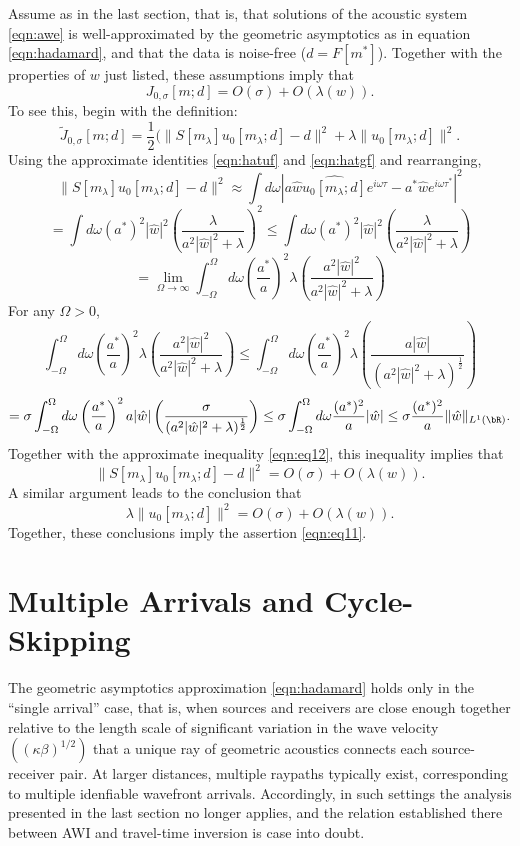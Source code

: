 Assume as in the last section, that is, that solutions
of the acoustic system \ref{eqn:awe} is well-approximated by the
geometric asymptotics as in equation \ref{eqn:hadamard}, and that the
data is noise-free ($d=F[m^*]$). Together with the properties of $w$
just listed, these assumptions imply that
\begin{equation}
  \label{eqn:eq11}
  J_{0,\sigma}[m;d] = O(\sigma) + O(\lambda(w)).
\end{equation}
To see this, begin with the definition:
\[
  \tilde{J}_{0,\sigma}[m;d] = \frac{1}{2}
  (\|S[m_{\lambda}]u_0[m_{\lambda};d]-d\|^2 + \lambda \|u_0[m_{\lambda};d]\|^2.
\]
Using the approximate identities \ref{eqn:hatuf} and \ref{eqn:hatgf} and
rearranging,
\[
\|S[m_{\lambda}]u_0[m_{\lambda};d]-d\|^2 
  \approx \int d\omega
  |a\hat{w}\hat{u_0[m_{\lambda};d]}e^{i\omega\tau}-a^*\hat{w}e^{i\omega\tau^*}|^2
\]
\[
  = \int d\omega
  (a^*)^2|\hat{w}|^2\left(\frac{\lambda}{a^2|\hat{w}|^2 +
      \lambda}\right)^2   
\le \int d\omega (a^*)^2|\hat{w}|^2
  \left(\frac{\lambda}{a^2|\hat{w}|^2 + \lambda}\right)
\]
\begin{equation}
  \label{eqn:eq12}
  = \lim_{\Omega \rightarrow \infty} \int_{-\Omega}^{\Omega} d\omega \left(\frac{a^*}{a}\right)^2\lambda
  \left(\frac{a^2|\hat{w}|^2}{a^2|\hat{w}|^2 + \lambda}\right)
\end{equation}
For any $\Omega > 0$,
\[
\int_{-\Omega}^{\Omega} d\omega \left(\frac{a^*}{a}\right)^2\lambda\left(\frac{a^2|\hat{w}|^2}{a^2|\hat{w}|^2 + \lambda}\right)
\le \int_{-\Omega}^{\Omega} d\omega \left(\frac{a^*}{a}\right)^2 \lambda
  \left(\frac{ a|\hat{w}|}{(a^2|\hat{w}|^2 +
      \lambda)^{\frac{1}{2}}}\right)
\]
\[
  = \sigma \int_{-\Omega}^{\Omega} d\omega \left(\frac{a^*}{a}\right)^2 a|\hat{w}|
  \left(\frac{\sigma }{(a^2|\hat{w}|^2 +\lambda)^{\frac{1}{2}}}\right)
  \le \sigma \int_{-\Omega}^{\Omega} d\omega \frac{(a^*)^2}{a}
  |\hat{w}|
  \le \sigma \frac{(a^*)^2}{a} \|\hat{w}\|_{L^1(\bR)}.
\]
Together with the approximate inequality \ref{eqn:eq12}, this
inequality implies
that
\[
  \|S[m_{\lambda}]u_0[m_{\lambda};d] - d\|^2 = O(\sigma) + O(\lambda(w)).
\]
A similar argument leads to the conclusion that
\[
  \lambda\|u_0[m_{\lambda};d]\|^2 = O(\sigma) + O(\lambda(w)).
\]
Together, these conclusions imply the assertion \ref{eqn:eq11}.


\section{Multiple Arrivals and Cycle-Skipping}
The geometric asymptotics approximation \ref{eqn:hadamard} holds only
in the ``single arrival'' case, that is, when sources and receivers
are close enough together relative to the length scale of significant
variation in the wave velocity $((\kappa\beta)^{1/2})$ that a unique ray of
geometric acoustics connects each source-receiver pair. At larger
distances, multiple raypaths typically exist, corresponding to
multiple idenfiable wavefront arrivals. Accordingly, in such settings
the analysis presented in the last section no longer applies, and the
relation established there between AWI and travel-time inversion is
case into doubt.

